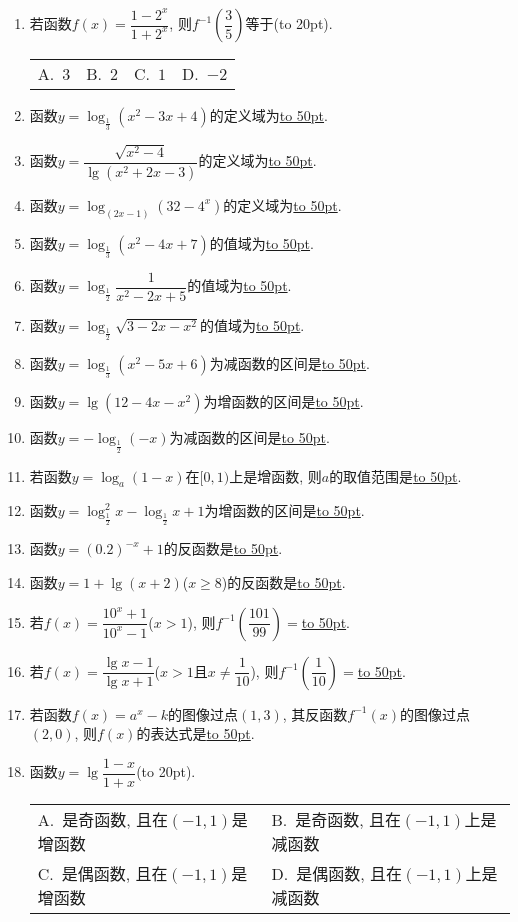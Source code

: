 \documentclass[10pt,a4paper]{article}
\newcommand{\blank}[1]{\underline{\hbox to #1pt{}}}
\newcommand{\bracket}[1]{(\hbox to #1pt{})}
\newcommand{\twoch}[4]{\par\begin{tabular}{p{.46\textwidth}p{.46\textwidth}}
A.~#1& B.~#2\\
C.~#3& D.~#4
\end{tabular}}
\newcommand{\fourch}[4]{\par\begin{tabular}{p{.23\textwidth}p{.23\textwidth}p{.23\textwidth}p{.23\textwidth}}
A.~#1 &B.~#2& C.~#3& D.~#4
\end{tabular}}
\begin{document}
\begin{enumerate}[1.]
{}
\item 若函数$f(x)=\dfrac{1-2^x}{1+2^x}$, 则$f^{-1}(\dfrac 35)$等于\bracket{20}.
\fourch{$3$}{$2$}{$1$}{$-2$}
\item 函数$y=\log_{\frac 13}(x^2-3x+4)$的定义域为\blank{50}.
\item 函数$y=\dfrac{\sqrt {x^2-4}}{\lg (x^2+2x-3)}$的定义域为\blank{50}.
\item 函数$y=\log_{(2x-1)}(32-4^x)$的定义域为\blank{50}.
\item 函数$y=\log_{\frac 13}(x^2-4x+7)$的值域为\blank{50}.
\item 函数$y=\log_{\frac 12}\dfrac 1{x^2-2x+5}$的值域为\blank{50}.
\item 函数$y=\log_{\frac 12}\sqrt {3-2x-x^2}$的值域为\blank{50}.
\item 函数$y=\log_{\frac 13}(x^2-5x+6)$为减函数的区间是\blank{50}.
\item 函数$y=\lg (12-4x-x^2)$为增函数的区间是\blank{50}.
\item 函数$y=-\log_{\frac 12}(-x)$为减函数的区间是\blank{50}.
\item 若函数$y=\log_a(1-x)$在$[0,1)$上是增函数, 则$a$的取值范围是\blank{50}.
\item 函数$y=\log_{\frac 12}^2x-\log_{\frac 12}x+1$为增函数的区间是\blank{50}.
\item 函数$y=(0.2)^{-x}+1$的反函数是\blank{50}.
\item 函数$y=1+\lg (x+2)$($x\ge 8$)的反函数是\blank{50}.
\item 若$f(x)=\dfrac{10^x+1}{10^x-1}$($x>1$), 则$f^{-1}(\dfrac{101}{99})=$\blank{50}.
\item 若$f(x)=\dfrac{\lg x-1}{\lg x+1}$($x>1$且$x\ne \dfrac 1{10}$), 则$f^{-1}(\dfrac 1{10})=$\blank{50}.
\item 若函数$f(x)=a^x-k$的图像过点$(1, 3)$, 其反函数$f^{-1}(x)$的图像过点$(2, 0)$, 则$f(x)$的表达式是\blank{50}.
\item 函数$y=\lg \dfrac{1-x}{1+x}$\bracket{20}.
\twoch{是奇函数, 且在$(-1, 1)$是增函数}{是奇函数, 且在$(-1, 1)$上是减函数}{是偶函数, 且在$(-1, 1)$是增函数}{是偶函数, 且在$(-1, 1)$上是减函数}

\end{enumerate}
\end{document}
